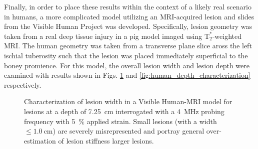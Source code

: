 			Finally, in order to place these results within the context of a likely real scenario in humans, a more complicated model utilizing an MRI-acquired lesion and slides from the Visible Human Project \cite{visiblehuman} was developed. Specifically, lesion geometry was taken from a real deep tissue injury in a pig model imaged using $\mathrm{T}_2^*$-weighted MRI. The human geometry was taken from a transverse plane slice aross the left ischial tuberosity such that the lesion was placed immediately superficial to the boney promience. For this model, the overall lesion width and lesion depth were examined with results shown in Figs. \ref{fig:human_size_characterization} and \ref{fig:human_depth_characterization} respectively.

			\begin{figure}[!t]
				\centering
				\caption[Quasi-static Visible Human model lesion width characterization]{Characterization of lesion width in a Visible Human-MRI model for lesions at a depth of \SI{7.25}{\cm} interrogated with a \SI{4}{\MHz} probing frequency with \SI{5}{\percent} applied strain. Small lesions (with a width $\leq \SI{1.0}{\cm}$) are severely misrepresented and portray general over-estimation of lesion stiffness larger lesions.}
				\label{fig:human_size_characterization}
			\end{figure}

